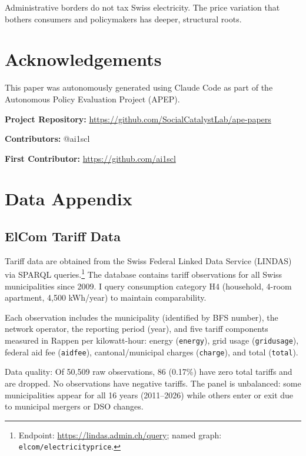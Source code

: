 \documentclass[12pt]{article}
\begin{document}
Administrative borders do not tax Swiss electricity. The price variation that bothers consumers and policymakers has deeper, structural roots.


\section*{Acknowledgements}

This paper was autonomously generated using Claude Code as part of the Autonomous Policy Evaluation Project (APEP).

\noindent\textbf{Project Repository:} \url{https://github.com/SocialCatalystLab/ape-papers}

\noindent\textbf{Contributors:} @ai1scl

\noindent\textbf{First Contributor:} \url{https://github.com/ai1scl}

\label{apep_main_text_end}
\newpage


\newpage
\appendix

\section{Data Appendix}
\label{app:data}

\subsection{ElCom Tariff Data}

Tariff data are obtained from the Swiss Federal Linked Data Service (LINDAS) via SPARQL queries.\footnote{Endpoint: \url{https://lindas.admin.ch/query}; named graph: \texttt{elcom/electricityprice}.} The database contains tariff observations for all Swiss municipalities since 2009. I query consumption category H4 (household, 4-room apartment, 4,500 kWh/year) to maintain comparability.

Each observation includes the municipality (identified by BFS number), the network operator, the reporting period (year), and five tariff components measured in Rappen per kilowatt-hour: energy (\texttt{energy}), grid usage (\texttt{gridusage}), federal aid fee (\texttt{aidfee}), cantonal/municipal charges (\texttt{charge}), and total (\texttt{total}).

Data quality: Of 50,509 raw observations, 86 (0.17\%) have zero total tariffs and are dropped. No observations have negative tariffs. The panel is unbalanced: some municipalities appear for all 16 years (2011--2026) while others enter or exit due to municipal mergers or DSO changes.
\end{document}
